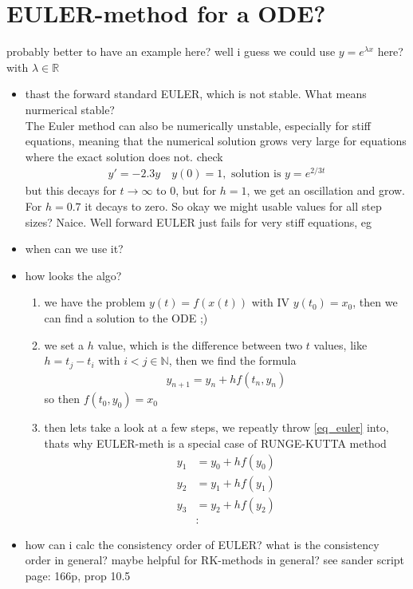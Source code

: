 \documentclass[]{scrartcl}
\newcommand{\N}{\mathbb{N}}
\newcommand{\R}{\mathbb{R}}
\newcommand{\<}{\trianglelefteq}
\begin{document}
\section*{EULER-method for a ODE?}
probably better to have an example here? well i guess we could use $y = e^{\lambda x}$ here? with $\lambda \in \R$
\begin{itemize}
	\item thast the forward standard EULER, which is not stable. What means nurmerical stable?\\
	The Euler method can also be numerically unstable, especially for stiff equations, meaning that the numerical solution grows very large for equations where the exact solution does not. check
	\begin{align*}
		y' = -2.3y \quad y(0) = 1, \text{ solution is } y = e^{2/3 t}
	\end{align*}
	but this decays for $t \to \infty$ to 0, but for $h = 1$, we get an oscillation and grow. For $h = 0.7$ it decays to zero. So okay we might usable values for all step sizes? Naice. Well forward EULER just fails for very stiff equations, eg
	\item when can we use it?
	\item how looks the algo?
	\begin{enumerate}
		\item we have the problem $y(t) = f(x(t))$ with IV $y(t_0) = x_0$, then we can find a solution to the ODE ;)
		\item we set a $h$ value, which is the difference between two $t$ values, like $h = t_j - t_i$ with $i< j \in \N$, then we find the formula
		\begin{align*}
			y_{n+1} = y_n + hf(t_n,y_n) \label{eq_euler}\tag{Euler}
		\end{align*}
		so then $f(t_0,y_0) = x_0$
		\item then lets take a look at a few steps, we repeatly throw \eqref{eq_euler} into, thats why EULER-meth is a special case of RUNGE-KUTTA method
		\begin{align*}
			y_1 &= y_0 +hf(y_0)\\
			y_2 & = y_1 + hf(y_1)\\
			y_3 &= y_2 + hf(y_2)\\
			&: 
		\end{align*}
	\end{enumerate}
	\item how can i calc the consistency order of EULER? what is the consistency order in general? maybe helpful for RK-methods in general? see sander script page: 166p, prop 10.5
\end{itemize}
\end{document}
